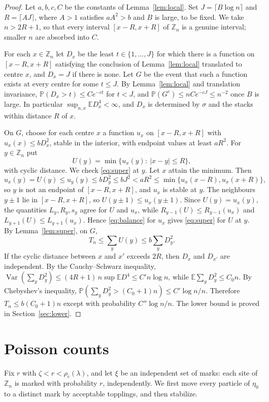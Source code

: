 \documentclass[11pt]{amsart}
\theoremstyle{remark}
\newcommand{\Z}{\mathbb Z}
\newcommand{\E}{\mathbb E}
\renewcommand{\Pr}{\mathbb P}
\begin{document}
\begin{proof}
Let $a,b,c,C$ be the constants of Lemma~\ref{lem:local}. Set $J=\lceil B\log n\rceil$ and $R=\lceil AJ\rceil$, where $A>1$
satisfies $aA^2>b$ and $B$ is large, to be fixed. We take $n>2R+1$, so that every interval $[x-R,x+R]$ of $\Z_n$ is a
genuine interval; smaller $n$ are absorbed into $C$.

For each $x\in\Z_n$ let $D_x$ be the least $t\in\{1,\ldots,J\}$ for which there is a function on $[x-R,x+R]$ satisfying
the conclusion of Lemma~\ref{lem:local} translated to centre $x$, and $D_x=J$ if there is none. Let $G$ be the event that
such a function exists at every centre for some $t\le J$. By Lemma~\ref{lem:local} and translation invariance,
$\Pr(D_x>t)\le Ce^{-ct}$ for $t<J$, and $\Pr(G^c)\le nCe^{-cJ}\le n^{-2}$ once $B$ is large. In particular
$\sup_{n,x}\E D_x^4<\infty$, and $D_x$ is determined by $\sigma$ and the stacks within distance $R$ of $x$.

On $G$, choose for each centre $x$ a function $u_x$ on $[x-R,x+R]$ with $u_x(x)\le bD_x^2$, stable in the interior,
with endpoint values at least $aR^2$. For $y\in\Z_n$ put
\[
U(y)=\min\{u_x(y):\ |x-y|\le R\},
\]
with cyclic distance. We check \eqref{eq:super} at $y$. Let $x$ attain the minimum. Then
\[
u_x(y)=U(y)\le u_y(y)\le bD_y^2\le bJ^2<aR^2\le\min\{u_x(x-R),u_x(x+R)\},
\]
so $y$ is not an endpoint of $[x-R,x+R]$, and $u_x$ is stable at $y$. The neighbours $y\pm1$ lie in $[x-R,x+R]$, so
$U(y\pm1)\le u_x(y\pm1)$. Since $U(y)=u_x(y)$, the quantities $L_y,R_y,s_y$ agree for $U$ and $u_x$, while $R_{y-1}(U)\le
R_{y-1}(u_x)$ and $L_{y+1}(U)\le L_{y+1}(u_x)$. Hence \eqref{eq:balance} for $u_x$ gives \eqref{eq:super} for $U$ at $y$.
By Lemma~\ref{lem:super}, on $G$,
\[
T_n\le\sum_yU(y)\le b\sum_y D_y^2 .
\]
If the cyclic distance between $x$ and $x'$ exceeds $2R$, then $D_x$ and $D_{x'}$ are independent. By the Cauchy--Schwarz
inequality, $\operatorname{Var}(\sum_yD_y^2)\le(4R+1)\,n\sup\E D^4\le C'n\log n$, while $\E\sum_yD_y^2\le C_0n$. By
Chebyshev's inequality, $\Pr(\sum_yD_y^2>(C_0+1)n)\le C'\log n/n$. Therefore $T_n\le b(C_0+1)n$ except with probability
$C''\log n/n$. The lower bound is proved in Section~\ref{sec:lower}.
\end{proof}

\section{Poisson counts}\label{sec:poisson}

Fix $r$ with $\zeta<r<\rho_c(\lambda)$, and let $\xi$ be an independent set of marks: each site of $\Z_n$ is marked with
probability $r$, independently. We first move every particle of $\eta_0$ to a distinct mark by acceptable topplings, and
then stabilize.
\end{document}
